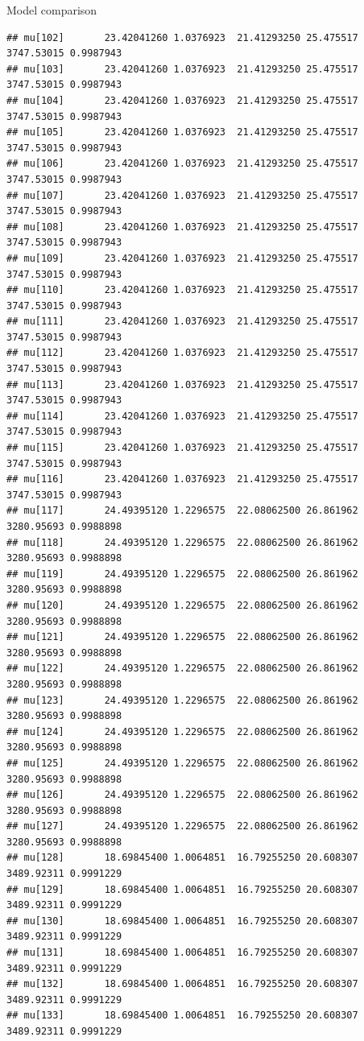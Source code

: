 \documentclass[
  ignorenonframetext,
]{beamer}
\begin{document}
\begin{frame}[fragile]{Model comparison}
\begin{verbatim}
## mu[102]       23.42041260 1.0376923  21.41293250 25.475517 3747.53015 0.9987943
## mu[103]       23.42041260 1.0376923  21.41293250 25.475517 3747.53015 0.9987943
## mu[104]       23.42041260 1.0376923  21.41293250 25.475517 3747.53015 0.9987943
## mu[105]       23.42041260 1.0376923  21.41293250 25.475517 3747.53015 0.9987943
## mu[106]       23.42041260 1.0376923  21.41293250 25.475517 3747.53015 0.9987943
## mu[107]       23.42041260 1.0376923  21.41293250 25.475517 3747.53015 0.9987943
## mu[108]       23.42041260 1.0376923  21.41293250 25.475517 3747.53015 0.9987943
## mu[109]       23.42041260 1.0376923  21.41293250 25.475517 3747.53015 0.9987943
## mu[110]       23.42041260 1.0376923  21.41293250 25.475517 3747.53015 0.9987943
## mu[111]       23.42041260 1.0376923  21.41293250 25.475517 3747.53015 0.9987943
## mu[112]       23.42041260 1.0376923  21.41293250 25.475517 3747.53015 0.9987943
## mu[113]       23.42041260 1.0376923  21.41293250 25.475517 3747.53015 0.9987943
## mu[114]       23.42041260 1.0376923  21.41293250 25.475517 3747.53015 0.9987943
## mu[115]       23.42041260 1.0376923  21.41293250 25.475517 3747.53015 0.9987943
## mu[116]       23.42041260 1.0376923  21.41293250 25.475517 3747.53015 0.9987943
## mu[117]       24.49395120 1.2296575  22.08062500 26.861962 3280.95693 0.9988898
## mu[118]       24.49395120 1.2296575  22.08062500 26.861962 3280.95693 0.9988898
## mu[119]       24.49395120 1.2296575  22.08062500 26.861962 3280.95693 0.9988898
## mu[120]       24.49395120 1.2296575  22.08062500 26.861962 3280.95693 0.9988898
## mu[121]       24.49395120 1.2296575  22.08062500 26.861962 3280.95693 0.9988898
## mu[122]       24.49395120 1.2296575  22.08062500 26.861962 3280.95693 0.9988898
## mu[123]       24.49395120 1.2296575  22.08062500 26.861962 3280.95693 0.9988898
## mu[124]       24.49395120 1.2296575  22.08062500 26.861962 3280.95693 0.9988898
## mu[125]       24.49395120 1.2296575  22.08062500 26.861962 3280.95693 0.9988898
## mu[126]       24.49395120 1.2296575  22.08062500 26.861962 3280.95693 0.9988898
## mu[127]       24.49395120 1.2296575  22.08062500 26.861962 3280.95693 0.9988898
## mu[128]       18.69845400 1.0064851  16.79255250 20.608307 3489.92311 0.9991229
## mu[129]       18.69845400 1.0064851  16.79255250 20.608307 3489.92311 0.9991229
## mu[130]       18.69845400 1.0064851  16.79255250 20.608307 3489.92311 0.9991229
## mu[131]       18.69845400 1.0064851  16.79255250 20.608307 3489.92311 0.9991229
## mu[132]       18.69845400 1.0064851  16.79255250 20.608307 3489.92311 0.9991229
## mu[133]       18.69845400 1.0064851  16.79255250 20.608307 3489.92311 0.9991229

\end{verbatim}
\end{frame}
\end{document}
